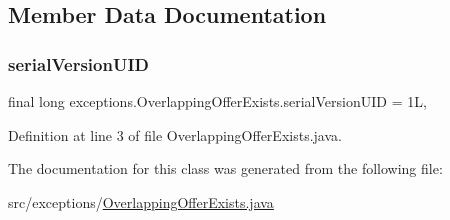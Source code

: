 \begin{DoxyCode}{0}

\end{DoxyCode}


\subsection{Member Data Documentation}
\mbox{\label{classexceptions_1_1OverlappingOfferExists_ab47bd08f41ac7a43204806e53aa1538a}} 
\subsubsection{\texorpdfstring{serialVersionUID}{serialVersionUID}}
{\footnotesize\ttfamily final long exceptions.\+Overlapping\+Offer\+Exists.\+serial\+Version\+U\+ID = 1L\hspace{0.3cm}{\ttfamily [static]}, {\ttfamily [private]}}



Definition at line 3 of file Overlapping\+Offer\+Exists.\+java.



The documentation for this class was generated from the following file\+:\begin{DoxyCompactItemize}
\item 
src/exceptions/\mbox{\hyperlink{OverlappingOfferExists_8java}{Overlapping\+Offer\+Exists.\+java}}\end{DoxyCompactItemize}
